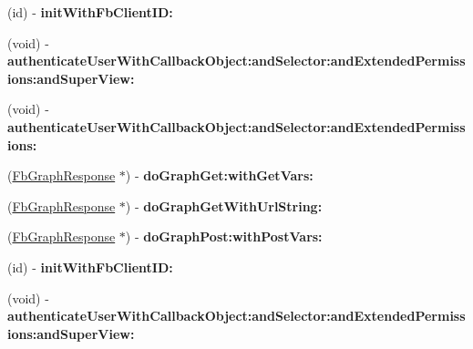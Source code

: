 \begin{DoxyCompactItemize}
\item 
\hypertarget{interface_fb_graph_afd510d4c2b40e9c3057829c3a44d46dc}{
(id) -\/ {\bfseries init\-With\-Fb\-Client\-I\-D\-:}}
\label{interface_fb_graph_afd510d4c2b40e9c3057829c3a44d46dc}

\item 
\hypertarget{interface_fb_graph_a1bc31d022ed142e48addf23d40119a02}{
(void) -\/ {\bfseries authenticate\-User\-With\-Callback\-Object\-:and\-Selector\-:and\-Extended\-Permissions\-:and\-Super\-View\-:}}
\label{interface_fb_graph_a1bc31d022ed142e48addf23d40119a02}

\item 
\hypertarget{interface_fb_graph_af67e03ac3dfd34b8cb954cfcf633595a}{
(void) -\/ {\bfseries authenticate\-User\-With\-Callback\-Object\-:and\-Selector\-:and\-Extended\-Permissions\-:}}
\label{interface_fb_graph_af67e03ac3dfd34b8cb954cfcf633595a}

\item 
\hypertarget{interface_fb_graph_aa17e4cf632e883ccce808d0afce0f396}{
(\hyperlink{interface_fb_graph_response}{\-Fb\-Graph\-Response} $\ast$) -\/ {\bfseries do\-Graph\-Get\-:with\-Get\-Vars\-:}}
\label{interface_fb_graph_aa17e4cf632e883ccce808d0afce0f396}

\item 
\hypertarget{interface_fb_graph_ab40685f4804b7cf54eead42829ba406e}{
(\hyperlink{interface_fb_graph_response}{\-Fb\-Graph\-Response} $\ast$) -\/ {\bfseries do\-Graph\-Get\-With\-Url\-String\-:}}
\label{interface_fb_graph_ab40685f4804b7cf54eead42829ba406e}

\item 
\hypertarget{interface_fb_graph_a2a8d5f375485e446458fba832fe03c81}{
(\hyperlink{interface_fb_graph_response}{\-Fb\-Graph\-Response} $\ast$) -\/ {\bfseries do\-Graph\-Post\-:with\-Post\-Vars\-:}}
\label{interface_fb_graph_a2a8d5f375485e446458fba832fe03c81}

\item 
\hypertarget{interface_fb_graph_afd510d4c2b40e9c3057829c3a44d46dc}{
(id) -\/ {\bfseries init\-With\-Fb\-Client\-I\-D\-:}}
\label{interface_fb_graph_afd510d4c2b40e9c3057829c3a44d46dc}

\item 
\hypertarget{interface_fb_graph_a1bc31d022ed142e48addf23d40119a02}{
(void) -\/ {\bfseries authenticate\-User\-With\-Callback\-Object\-:and\-Selector\-:and\-Extended\-Permissions\-:and\-Super\-View\-:}}
\label{interface_fb_graph_a1bc31d022ed142e48addf23d40119a02}


\end{DoxyCompactItemize}
